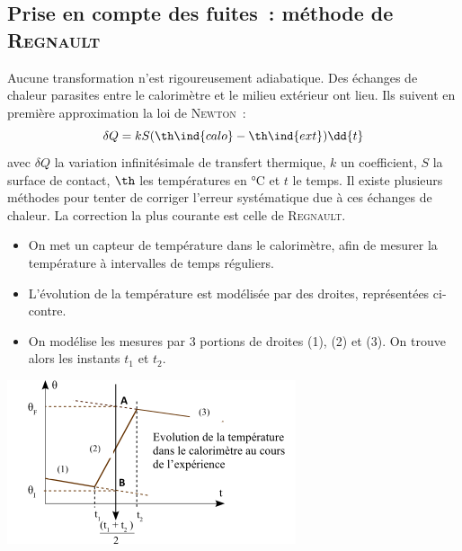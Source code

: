 \documentclass[../main/main.tex]{subfiles}
\begin{document}
{	\subsection{Prise en compte des fuites~: méthode de \textsc{Regnault}}
	Aucune transformation n'est rigoureusement adiabatique. Des échanges de
	chaleur parasites entre le calorimètre et le milieu extérieur ont lieu. Ils
	suivent en première approximation la loi de \textsc{Newton}~:
	\[
		\delta Q = kS (\th\ind{calo} - \th\ind{ext})\dd{t}
	\]
	avec $\delta Q$ la variation infinitésimale de transfert thermique, $k$ un
	coefficient, $S$ la surface de contact, $\th$ les températures en
	\si{\degreeCelsius} et $t$ le temps.
	\smallbreak
	Il existe plusieurs méthodes pour tenter de corriger l'erreur systématique
	due à ces échanges de chaleur. La correction la plus courante est celle de
	\textsc{Regnault}.
	\smallbreak
	\noindent
	\begin{minipage}[c]{.45\linewidth}
		\begin{itemize}
			\item On met un capteur de température dans le calorimètre, afin de
			      mesurer la température à intervalles de temps réguliers.
			\item L'évolution de la température est modélisée par des droites,
			      représentées ci-contre.
			\item On modélise les mesures par 3 portions de droites (1), (2) et
			      (3). On trouve alors les instants $t_1$ et $t_2$.
		\end{itemize}
	\end{minipage}
	\hfill
	\noindent
	\begin{minipage}[c]{.53\linewidth}
		\begin{center}
			\includegraphics[width=\linewidth]{regnault}
		\end{center}

\end{minipage}}
\end{document}
